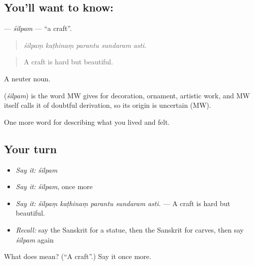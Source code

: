 \subsection*{You'll want to know: }
\textbf{} — \emph{śilpam} — \textquotedblleft{}a craft\textquotedblright{}.

\begin{quote}
    
\end{quote}

\begin{quote}
\emph{śilpaṃ kaṭhinaṃ parantu sundaram asti.}
\end{quote}

\begin{quote}
A craft is hard but beautiful.
\end{quote}

A neuter noun.

\begin{cousinweb}
\textbf{} (\emph{śilpam}) is the word MW gives for decoration, ornament, artistic work, and MW itself calls it of doubtful derivation, so its origin is uncertain (MW).
\end{cousinweb}

\begin{grammarlens}[title={What you've built}]
One more word for describing what you lived and felt.
\end{grammarlens}

\subsection*{Your turn}
\begin{itemize}
\raggedright
  \item \emph{Say it:} \emph{śilpam}
  \item \emph{Say it:} \emph{śilpam}, once more
  \item \emph{Say it:} \emph{śilpaṃ kaṭhinaṃ parantu sundaram asti.} — A craft is hard but beautiful.
  \item \emph{Recall:} say the Sanskrit for a statue, then the Sanskrit for carves, then say \emph{śilpam} again
\end{itemize}

\begin{tcolorbox}[breakable,colback=teal!4,colframe=teal!35!black,title={Before you move on}]
What does  mean? (\textquotedblleft{}A craft\textquotedblright{}.) Say it once more.
\end{tcolorbox}
